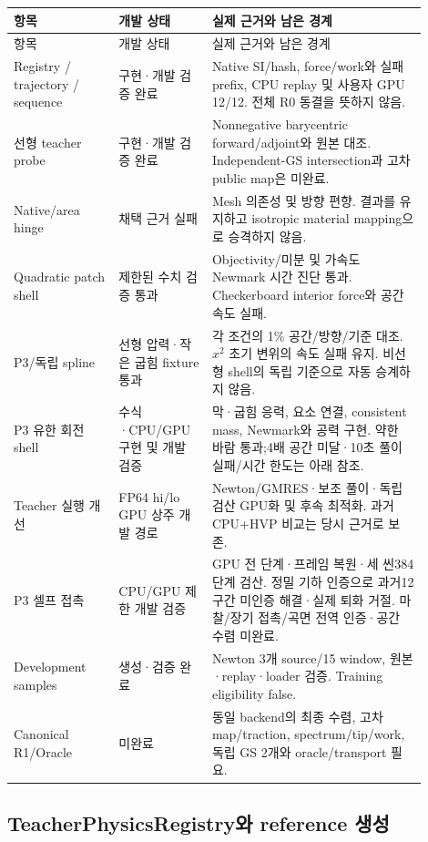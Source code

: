 \documentclass[10pt]{article}
\begin{document}
\begin{longtable}{L{0.23\linewidth}L{0.20\linewidth}L{0.47\linewidth}}
\toprule
항목 & 개발 상태 & 실제 근거와 남은 경계\\
\midrule
\endfirsthead
\toprule 항목 & 개발 상태 & 실제 근거와 남은 경계\\ \midrule
\endhead
Registry / trajectory / sequence & 구현·개발 검증 완료 & Native SI/hash, force/work와 실패 prefix, CPU replay 및 사용자 GPU 12/12. 전체 R0 동결을 뜻하지 않음.\\
선형 teacher probe & 구현·개발 검증 완료 & Nonnegative barycentric forward/adjoint와 원본 대조. Independent-GS intersection과 고차 public map은 미완료.\\
Native/area hinge & 채택 근거 실패 & Mesh 의존성 및 방향 편향. 결과를 유지하고 isotropic material mapping으로 승격하지 않음.\\
Quadratic patch shell & 제한된 수치 검증 통과 & Objectivity/미분 및 가속도 Newmark 시간 진단 통과. Checkerboard interior force와 공간 속도 실패.\\
P3/독립 spline & 선형 압력·작은 굽힘 fixture 통과 & 각 조건의 1\% 공간/방향/기준 대조. \(x^2\) 초기 변위의 속도 실패 유지. 비선형 shell의 독립 기준으로 자동 승계하지 않음.\\
P3 유한 회전 shell & 수식·CPU/GPU 구현 및 개발 검증 & 막·굽힘 응력, 요소 연결, consistent mass, Newmark와 공력 구현. 약한 바람 통과;4배 공간 미달·10초 풀이 실패/시간 한도는 아래 참조.\\
Teacher 실행 개선 & FP64 hi/lo GPU 상주 개발 경로 & Newton/GMRES·보조 풀이·독립 검산 GPU화 및 후속 최적화. 과거 CPU+HVP 비교는 당시 근거로 보존.\\
P3 셀프 접촉 & CPU/GPU 제한 개발 검증 & GPU 전 단계·프레임 복원·세 씬384단계 검산. 정밀 기하 인증으로 과거12구간 미인증 해결·실제 퇴화 거절. 마찰/장기 접촉/곡면 전역 인증·공간 수렴 미완료.\\
Development samples & 생성·검증 완료 & Newton 3개 source/15 window, 원본·replay·loader 검증. Training eligibility false.\\
Canonical R1/Oracle & 미완료 & 동일 backend의 최종 수렴, 고차 map/traction, spectrum/tip/work, 독립 GS 2개와 oracle/transport 필요.\\
\bottomrule
\end{longtable}

\subsection{TeacherPhysicsRegistry와 reference 생성}
\end{document}
